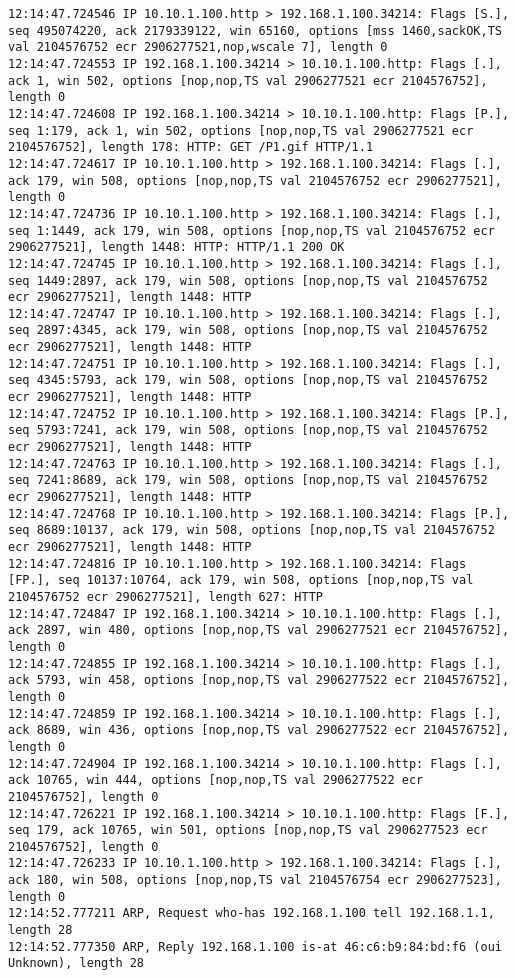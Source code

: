 \documentclass{article}
\begin{document}
{\begin{lstlisting}
12:14:47.724546 IP 10.10.1.100.http > 192.168.1.100.34214: Flags [S.], seq 495074220, ack 2179339122, win 65160, options [mss 1460,sackOK,TS val 2104576752 ecr 2906277521,nop,wscale 7], length 0
12:14:47.724553 IP 192.168.1.100.34214 > 10.10.1.100.http: Flags [.], ack 1, win 502, options [nop,nop,TS val 2906277521 ecr 2104576752], length 0
12:14:47.724608 IP 192.168.1.100.34214 > 10.10.1.100.http: Flags [P.], seq 1:179, ack 1, win 502, options [nop,nop,TS val 2906277521 ecr 2104576752], length 178: HTTP: GET /P1.gif HTTP/1.1
12:14:47.724617 IP 10.10.1.100.http > 192.168.1.100.34214: Flags [.], ack 179, win 508, options [nop,nop,TS val 2104576752 ecr 2906277521], length 0
12:14:47.724736 IP 10.10.1.100.http > 192.168.1.100.34214: Flags [.], seq 1:1449, ack 179, win 508, options [nop,nop,TS val 2104576752 ecr 2906277521], length 1448: HTTP: HTTP/1.1 200 OK
12:14:47.724745 IP 10.10.1.100.http > 192.168.1.100.34214: Flags [.], seq 1449:2897, ack 179, win 508, options [nop,nop,TS val 2104576752 ecr 2906277521], length 1448: HTTP
12:14:47.724747 IP 10.10.1.100.http > 192.168.1.100.34214: Flags [.], seq 2897:4345, ack 179, win 508, options [nop,nop,TS val 2104576752 ecr 2906277521], length 1448: HTTP
12:14:47.724751 IP 10.10.1.100.http > 192.168.1.100.34214: Flags [.], seq 4345:5793, ack 179, win 508, options [nop,nop,TS val 2104576752 ecr 2906277521], length 1448: HTTP
12:14:47.724752 IP 10.10.1.100.http > 192.168.1.100.34214: Flags [P.], seq 5793:7241, ack 179, win 508, options [nop,nop,TS val 2104576752 ecr 2906277521], length 1448: HTTP
12:14:47.724763 IP 10.10.1.100.http > 192.168.1.100.34214: Flags [.], seq 7241:8689, ack 179, win 508, options [nop,nop,TS val 2104576752 ecr 2906277521], length 1448: HTTP
12:14:47.724768 IP 10.10.1.100.http > 192.168.1.100.34214: Flags [P.], seq 8689:10137, ack 179, win 508, options [nop,nop,TS val 2104576752 ecr 2906277521], length 1448: HTTP
12:14:47.724816 IP 10.10.1.100.http > 192.168.1.100.34214: Flags [FP.], seq 10137:10764, ack 179, win 508, options [nop,nop,TS val 2104576752 ecr 2906277521], length 627: HTTP
12:14:47.724847 IP 192.168.1.100.34214 > 10.10.1.100.http: Flags [.], ack 2897, win 480, options [nop,nop,TS val 2906277521 ecr 2104576752], length 0
12:14:47.724855 IP 192.168.1.100.34214 > 10.10.1.100.http: Flags [.], ack 5793, win 458, options [nop,nop,TS val 2906277522 ecr 2104576752], length 0
12:14:47.724859 IP 192.168.1.100.34214 > 10.10.1.100.http: Flags [.], ack 8689, win 436, options [nop,nop,TS val 2906277522 ecr 2104576752], length 0
12:14:47.724904 IP 192.168.1.100.34214 > 10.10.1.100.http: Flags [.], ack 10765, win 444, options [nop,nop,TS val 2906277522 ecr 2104576752], length 0
12:14:47.726221 IP 192.168.1.100.34214 > 10.10.1.100.http: Flags [F.], seq 179, ack 10765, win 501, options [nop,nop,TS val 2906277523 ecr 2104576752], length 0
12:14:47.726233 IP 10.10.1.100.http > 192.168.1.100.34214: Flags [.], ack 180, win 508, options [nop,nop,TS val 2104576754 ecr 2906277523], length 0
12:14:52.777211 ARP, Request who-has 192.168.1.100 tell 192.168.1.1, length 28
12:14:52.777350 ARP, Reply 192.168.1.100 is-at 46:c6:b9:84:bd:f6 (oui Unknown), length 28
\end{lstlisting}
}
\end{document}

